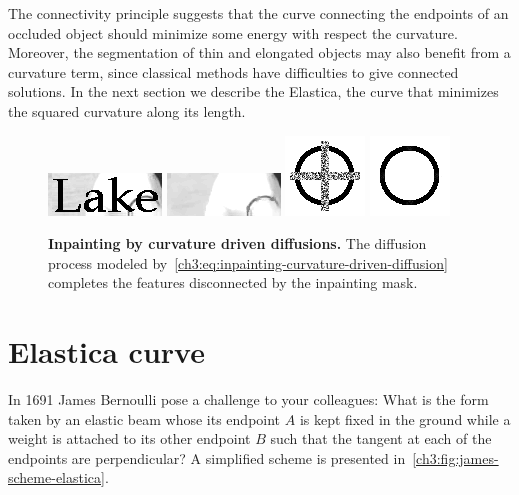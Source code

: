 The connectivity principle suggests that the curve connecting the endpoints of an occluded object should minimize some energy with respect the curvature. Moreover, the segmentation of thin and elongated objects may also benefit from a curvature term, since classical methods have difficulties to give connected solutions. In the next section we describe the Elastica, the curve that minimizes the squared curvature along its length.

\begin{figure}
\center
\includegraphics[scale=1]{figures/chapter3/inpainting-cdd/lake-1.png}\hspace{0.5em}
\includegraphics[scale=1]{figures/chapter3/inpainting-cdd/lake-2.png}\hspace{3em}
\includegraphics[scale=0.6]{figures/chapter3/inpainting-cdd/circle-1.png}\hspace{0.5em}
\includegraphics[scale=0.6]{figures/chapter3/inpainting-cdd/circle-2.png}
\caption{\textbf{Inpainting by curvature driven diffusions.}\cite{chan01nontexture} The diffusion process modeled by~\cref{ch3:eq:inpainting-curvature-driven-diffusion} completes the features disconnected by the inpainting mask.}
\label{ch3:fig:inpainting-curvature-driven-diffusion}
\end{figure}



\section{Elastica curve}
\label{ch3:sec:elastica-curve}

In 1691 James Bernoulli pose a challenge to your colleagues: What is the form taken by an elastic beam whose its endpoint $A$ is kept fixed in the ground while a weight is attached to its other endpoint $B$ such that the tangent at each of the endpoints are perpendicular? A simplified scheme is presented in~\cref{ch3:fig:james-scheme-elastica}.

